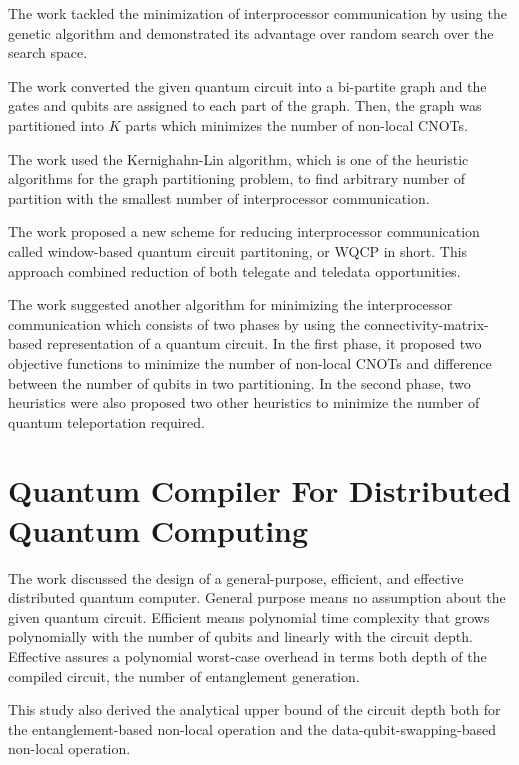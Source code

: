 The work \cite{genetic} tackled the minimization of interprocessor communication by using the genetic algorithm and demonstrated its advantage over random search over the search space.

The work \cite{dynamic} converted the given quantum circuit into a bi-partite graph and the gates and qubits are assigned to each part of the graph.  Then, the graph was partitioned into $K$ parts which minimizes the number of non-local CNOTs.

The work \cite{Kernighahn-Lin} used the Kernighahn-Lin algorithm, which is one of the heuristic algorithms for the graph partitioning problem, to find arbitrary number of partition with the smallest number of interprocessor communication.

The work \cite{WQCP} proposed a new scheme for reducing interprocessor communication called window-based quantum circuit partitoning, or WQCP in short.  This approach combined reduction of both telegate and teledata opportunities. 

The work \cite{matrix} suggested another algorithm for minimizing the interprocessor communication which consists of two phases by using the connectivity-matrix-based representation of a quantum circuit.
In the first phase, it proposed two objective functions to minimize the number of non-local CNOTs and difference between the number of qubits in two partitioning.  In the second phase, two heuristics were also proposed two other heuristics to minimize the number of quantum teleportation required.

\section{Quantum Compiler For Distributed Quantum Computing}

The work \cite{distributedquantumcompiler} discussed the design of a general-purpose, efficient, and effective distributed quantum computer. General purpose means no assumption about the given quantum circuit. Efficient means polynomial time complexity that grows polynomially with the number of qubits and linearly with the circuit depth.  Effective assures a polynomial worst-case overhead in terms both depth of the compiled circuit, the number of entanglement generation.

 This study also derived the analytical upper bound of the circuit depth both for the entanglement-based non-local operation and the data-qubit-swapping-based non-local operation.
 
